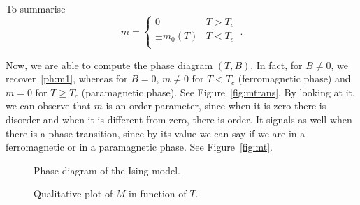     To summarise 
    \begin{equation}\label{ph:mtc}
        m = \begin{cases}
            0 & T > T_c \\ 
            \pm m_0(T) & T < T_c \\ 
        \end{cases} ~.
    \end{equation}

    Now, we are able to compute the phase diagram $(T, B)$. In fact, for $B \neq 0$, we recover~\eqref{ph:m1}, whereas for $B=0$, $m \neq 0$ for $T < T_c$ (ferromagnetic phase) and $m = 0$ for $T \geq T_c$ (paramagnetic phase). See Figure~\eqref{fig:mtrans}. By looking at it, we can observe that $m$ is an order parameter, since when it is zero there is disorder and when it is different from zero, there is order. It signals as well when there is a phase transition, since by its value we can say if we are in a ferromagnetic or in a paramagnetic phase. See Figure~\eqref{fig:mt}.
    
    \begin{figure}[h!]
        \centering
        \caption{Phase diagram of the Ising model.}
        \label{fig:mtrans}
    \end{figure}
    
    \begin{figure}[h!]
        \centering
        \caption{Qualitative plot of $M$ in function of $T$.}
        \label{fig:mt}
    \end{figure}


